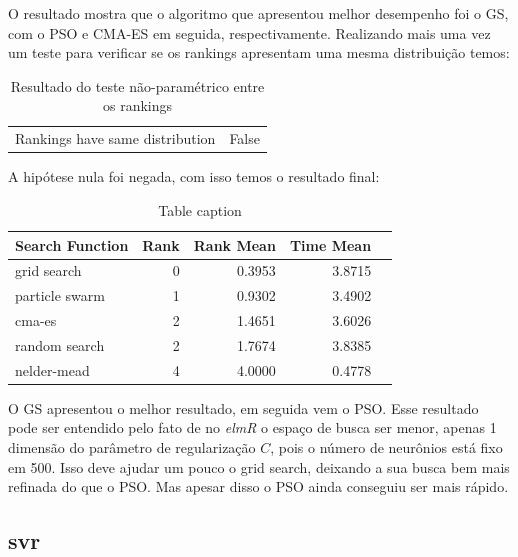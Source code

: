 \documentclass[preprint,12pt]{elsarticle}
\begin{document}
O resultado mostra que o algoritmo que apresentou melhor desempenho foi o GS, com o PSO e CMA-ES em seguida, respectivamente. Realizando mais uma vez um teste para verificar se os rankings apresentam uma mesma distribuição temos:

\begin{table}[h]
	\centering
	\begin{tabular}{l r}
		
		Rankings have same distribution  &  False \\
		
	\end{tabular}
	\caption{Resultado do teste não-paramétrico entre os rankings}
\end{table}

A hipótese nula foi negada, com isso temos o resultado final:

\begin{table}[h]
	\centering
	\begin{tabular}{lrrrr}
		\hline
		Search Function   &   Rank &   Rank Mean &      Time Mean \\
		\hline
		grid search       &      0 &    0.3953 &     3.8715  \\
		particle swarm    &      1 &    0.9302 &      3.4902  \\
		cma-es            &      2 &    1.4651  &     3.6026  \\
		random search     &      2 &    1.7674  &     3.8385  \\
		nelder-mead       &      4 &    4.0000    &    0.4778 \\
		\hline
	\end{tabular}
	
	\caption{Table caption}
\end{table}

O GS apresentou o melhor resultado, em seguida vem o PSO. Esse resultado pode ser entendido pelo fato de no \textit{elmR} o espaço de busca ser menor, apenas 1 dimensão do parâmetro de regularização $C$, pois o número de neurônios está fixo em 500. Isso deve ajudar um pouco o grid search, deixando a sua busca bem mais refinada do que o PSO. Mas apesar disso o PSO ainda conseguiu ser mais rápido.

\subsection{svr}
\end{document}
